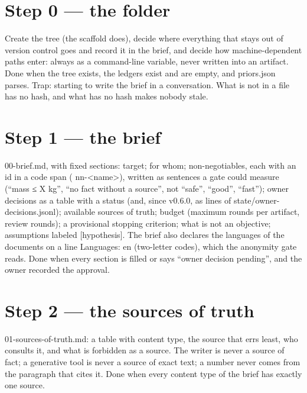 \documentclass[
  american,
  10pt,
]{report}
\renewcommand{\texttt}[1]{{\ttfamily\hyphenchar\font=-1 #1}}
\begin{document}
\section{Step 0 --- the folder}\label{step-0-the-folder}

Create the tree (the scaffold does), decide where everything that stays
out of version control goes and record it in the brief, and decide how
machine-dependent paths enter: always as a command-line variable, never
written into an artifact. Done when the tree exists, the ledgers exist
and are empty, and \texttt{priors.\allowbreak{}json} parses. Trap:
starting to write the brief in a conversation. What is not in a file has
no hash, and what has no hash makes nobody stale.

\section{Step 1 --- the brief}\label{step-1-the-brief}

\texttt{00-\allowbreak{}brief.\allowbreak{}md}, with fixed sections:
target; for whom; non-negotiables, each with an id in a code span
(\texttt{nn-\allowbreak{}<name>}), written as sentences a gate could
measure (``mass ≤ X kg'', ``no fact without a source'', not ``safe'',
``good'', ``fast''); owner decisions as a table with a status (and,
since v0.6.0, as lines of
\texttt{state/\allowbreak{}owner-\allowbreak{}decisions.\allowbreak{}jsonl});
available sources of truth; budget (maximum rounds per artifact, review
rounds); a provisional stopping criterion; what is not an objective;
assumptions labeled \texttt{[hypothesis]}. The brief also declares the
languages of the documents on a line \texttt{Languages:\allowbreak{} en}
(two-letter codes), which the anonymity gate reads. Done when every
section is filled or says ``owner decision pending'', and the owner
recorded the approval.

\section{Step 2 --- the sources of
truth}\label{step-2-the-sources-of-truth}

\texttt{01-\allowbreak{}sources-\allowbreak{}of-\allowbreak{}truth.\allowbreak{}md}:
a table with content type, the source that errs least, who consults it,
and what is forbidden as a source. The writer is never a source of fact;
a generative tool is never a source of exact text; a number never comes
from the paragraph that cites it. Done when every content type of the
brief has exactly one source.
\end{document}
